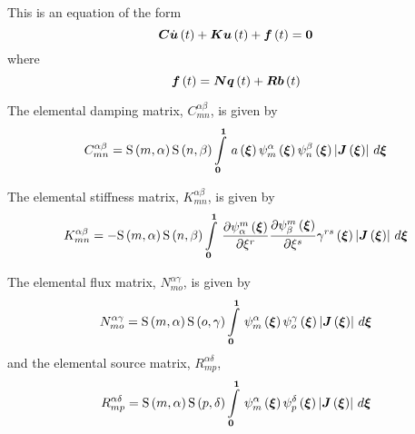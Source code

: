 This is an equation of the form
\begin{equation}
  \matr{C}\fnof{\dot{\vect{u}}}{t}+\matr{K}\fnof{\vect{u}}{t}+\fnof{\vect{f}}{t}=\vect{0}
\end{equation}
where
\begin{equation}
  \fnof{\vect{f}}{t}=\matr{N}\fnof{\vect{q}}{t}+\matr{R}\fnof{\vect{b}}{t}
\end{equation}

The elemental damping matrix, $C^{\alpha\beta}_{mn}$, is given by
\begin{equation}
  C^{\alpha\beta}_{mn} =
  \gsf{m}{\alpha}\gsf{n}{\beta}\gint{\vect{0}}{\vect{1}}{\fnof{a}{\vect{\xi}}
    \gbfn{m}{\alpha}{\vect{\xi}}\gbfn{n}{\beta}{\vect{\xi}}
    \abs{\fnof{\matr{J}}{\vect{\xi}}}}{\vect{\xi}}
\end{equation}

The elemental stiffness matrix, $K^{\alpha\beta}_{mn}$, is given by
\begin{equation}
  K^{\alpha\beta}_{mn} = -\gsf{m}{\alpha}\gsf{n}{\beta}\gint{\vect{0}}{\vect{1}}{
    \delby{\gbfn{\alpha}{m}{\vect{\xi}}}{\xi^{r}}\delby{\gbfn{\beta}{m}{\vect{\xi}}}{\xi^{s}}
    \fnof{\gamma^{rs}}{\vect{\xi}}\abs{\fnof{\matr{J}}{\vect{\xi}}}}{\vect{\xi}}
\end{equation}

The elemental flux matrix, $N^{\alpha\gamma}_{mo}$, is given by
\begin{equation}
  N^{\alpha\gamma}_{mo} =\gsf{m}{\alpha}\gsf{o}{\gamma}
  \gint{\vect{0}}{\vect{1}}{\gbfn{m}{\alpha}{\vect{\xi}}\gbfn{o}{\gamma}{\vect{\xi}}
    \abs{\fnof{\matr{J}}{\vect{\xi}}}}{\vect{\xi}}
\end{equation}
and the elemental source matrix, $R^{\alpha\delta}_{mp}$, 
\begin{equation}
  R^{\alpha\delta}_{mp}=\gsf{m}{\alpha}\gsf{p}{\delta}
  \gint{\vect{0}}{\vect{1}}{\gbfn{m}{\alpha}{\vect{\xi}}\gbfn{p}{\delta}{\vect{\xi}}
    \abs{\fnof{\matr{J}}{\vect{\xi}}}}{\vect{\xi}}
\end{equation}
